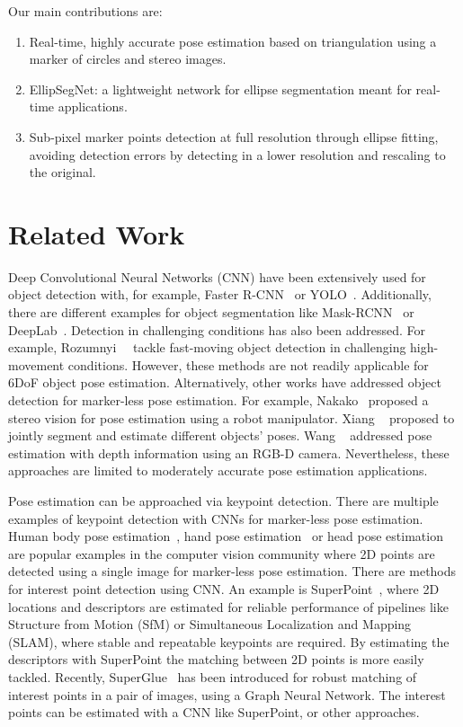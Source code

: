 \documentclass[final]{cvpr}
\begin{document}
Our main contributions are:
\begin{enumerate}
    \item Real-time, highly accurate pose estimation based on triangulation using a marker of circles and stereo images.
    \item EllipSegNet: a lightweight network for ellipse segmentation meant for real-time applications.
    \item Sub-pixel marker points detection at full resolution through ellipse fitting, avoiding detection errors by detecting in a lower resolution and rescaling to the original.
\end{enumerate}





\section{Related Work}
Deep Convolutional Neural Networks (CNN) have been extensively used for object detection with, for example, Faster R-CNN~\cite{ren2016faster} or YOLO~\cite{redmon2016you}. Additionally, there are different examples for object segmentation like Mask-RCNN~\cite{he2017mask} or DeepLab~\cite{chen2017deeplab}. Detection in challenging conditions has also been addressed. For example, Rozumnyi~\etal~\cite{rozumnyi2020fmodetect} tackle fast-moving object detection in challenging high-movement conditions. However, these methods are not readily applicable for 6DoF object pose estimation. Alternatively, other works have addressed object detection for marker-less pose estimation. For example, Nakako~\cite{nakano2020stereo} proposed a stereo vision for pose estimation using a robot manipulator. Xiang \etal~\cite{xiang2017posecnn} proposed to jointly segment and estimate different objects' poses. Wang \etal~\cite{wang2019normalized} addressed pose estimation with depth information using an RGB-D camera. Nevertheless, these approaches are limited to moderately accurate pose estimation applications.

Pose estimation can be approached via keypoint detection. There are multiple examples of keypoint detection with CNNs for marker-less pose estimation. Human body pose estimation~\cite{andriluka2018posetrack}, hand pose estimation~\cite{ge20193d} or head pose estimation~\cite{gupta2019nose} are popular examples in the computer vision community where 2D points are detected using a single image for marker-less pose estimation. There are methods for interest point detection using CNN. An example is SuperPoint~\cite{detone2018superpoint}, where 2D locations and descriptors are estimated for reliable performance of pipelines like Structure from Motion (SfM) or Simultaneous Localization and Mapping (SLAM), where stable and repeatable keypoints are required. By estimating the descriptors with SuperPoint the matching between 2D points is more easily tackled. Recently, SuperGlue~\cite{sarlin2020superglue} has been introduced for robust matching of interest points in a pair of images, using a Graph Neural Network. The interest points can be estimated with a CNN like SuperPoint, or other approaches.
\end{document}
